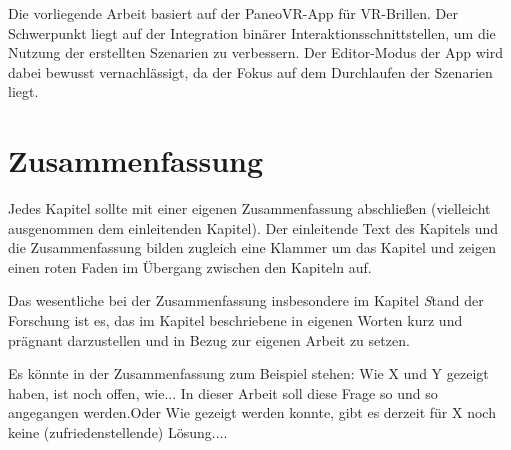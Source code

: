 
Die vorliegende Arbeit basiert auf der PaneoVR-App für VR-Brillen. Der Schwerpunkt liegt auf der Integration binärer Interaktionsschnittstellen, um die Nutzung der erstellten Szenarien zu verbessern. Der Editor-Modus der App wird dabei bewusst vernachlässigt, da der Fokus auf dem Durchlaufen der Szenarien liegt.

\section{Zusammenfassung} 

Jedes Kapitel sollte mit einer eigenen Zusammenfassung abschließen (vielleicht
ausgenommen dem einleitenden Kapitel). Der einleitende Text des Kapitels und die
Zusammenfassung bilden zugleich eine Klammer um das Kapitel und zeigen einen
roten Faden im Übergang zwischen den Kapiteln auf. 

Das wesentliche bei der Zusammenfassung insbesondere im Kapitel {\emph Stand der
Forschung} ist es, das im Kapitel beschriebene in eigenen Worten kurz und prägnant
darzustellen und in Bezug zur eigenen Arbeit zu setzen.

Es könnte in der Zusammenfassung zum Beispiel stehen: \glqq Wie X und Y gezeigt
haben, ist noch offen, wie... In dieser Arbeit soll diese Frage so und so
angegangen werden.\grqq Oder \glqq Wie gezeigt werden konnte, gibt es derzeit für X
noch keine (zufriedenstellende) Lösung...\grqq.
